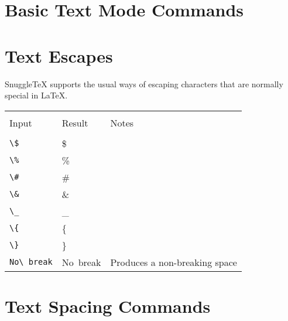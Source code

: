 
\section*{Basic Text Mode Commands}

\newenvironment{demotable}
{\begin{center}
 \begin{tabular}{|l|l|}
 \hline \\
 Input & Result \\
 \hline \\
}{\hline
 \end{tabular}
 \end{center}
}

\newenvironment{ndemotable}
{\begin{center}
 \begin{tabular}{|l|l|l|}
 \hline \\
 Input & Result & Notes \\
 \hline \\
}{\hline
 \end{tabular}
 \end{center}
}

\newcommand{\note}[1]{\small #1}
\newcommand{\demo}[1]{\verb|#1| & #1 \\}
\newcommand{\ndemo}[2]{\verb|#1| & #1 & \note{#2} \\}
\newcommand{\bigdemo}[1]{\begin{verbatim}#1\end{verbatim} & #1 \\}

\section*{Text Escapes}

SnuggleTeX supports the usual ways of escaping characters that are normally
special in LaTeX.

\begin{ndemotable}
\demo{\$}
\demo{\%}
\demo{\#}
\demo{\&}
\demo{\_}
\demo{\{}
\demo{\}}
\ndemo{No\ break}{Produces a non-breaking space}
\end{ndemotable}

\section*{Text Spacing Commands}

